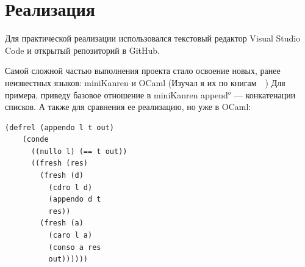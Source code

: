 % 


% 





\section{Реализация}
Для практической реализации использовался текстовый редактор Visual Studio Code и открытый репозиторий в GitHub.

Самой сложной частью выполнения проекта стало освоение новых, ранее неизвестных языков: miniKanren и OCaml (Изучал я их по книгам~\cite{reasoned_schemer}~\cite{prog_ocaml})
Для примера, приведу базовое отношение в miniKanren append$^o$ --- конкатенации списков. А также для сравнения ее реализацию, но уже в OCaml:


\begin{lstlisting}[caption=Append$^o$, frame=single]
  (defrel (appendo l t out)
    (conde
      ((nullo l) (== t out))
      ((fresh (res)
        (fresh (d)
          (cdro l d)
          (appendo d t
          res))
        (fresh (a)
          (caro l a)
          (conso a res
          out))))))
\end{lstlisting}

